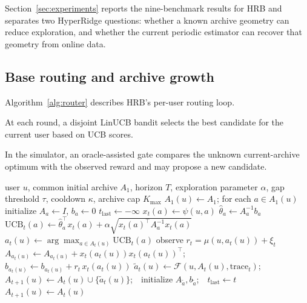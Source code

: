 \documentclass{article} %
\renewcommand{\eqref}[1]{\textup{(\ref{#1})}}
\begin{document}
Section~\ref{sec:experiments} reports the nine-benchmark results for
HRB and separates two HyperRidge questions: whether a known
archive geometry can reduce exploration, and whether the current periodic
estimator can recover that geometry from online data.

\subsection{Base routing and archive growth}

Algorithm~\ref{alg:router} describes HRB's per-user routing loop.

At each round, a disjoint LinUCB bandit selects the best candidate for the current user based on UCB scores.

In the simulator, an oracle-assisted gate compares the unknown current-archive optimum with the observed reward and may propose a new candidate.

\begin{algorithm}[t]
\caption{HyperRidge-Base (HRB): per-user routing over a growing archive}
\label{alg:router}
\begin{algorithmic}[1]
\Require user $u$, common initial archive $A_1$, horizon $T$, exploration parameter $\alpha$, gap threshold $\tau$, cooldown $\kappa$, archive cap $K_{\max}$
\State $A_1(u) \gets A_1$; for each $a \in A_1(u)$ initialize $A_a \gets I$, $b_a \gets 0$
\State $t_{\mathrm{last}} \gets -\infty$
        \State $x_t(a) \gets \psi(u,a)$ \Comment{feature map, \eqref{eq:method-feat}}
        \State $\hat\theta_a \gets A_a^{-1} b_a$
        \State $\mathrm{UCB}_t(a) \gets \hat\theta_a^\top x_t(a) + \alpha \sqrt{x_t(a)^\top A_a^{-1} x_t(a)}$
    \EndFor
    \State $a_t(u) \gets \arg\max_{a \in A_t(u)} \mathrm{UCB}_t(a)$
    \State observe $r_t = \mu(u, a_t(u)) + \xi_t$
    \State $A_{a_t(u)} \gets A_{a_t(u)} + x_t(a_t(u)) x_t(a_t(u))^\top$;\quad $b_{a_t(u)} \gets b_{a_t(u)} + r_t \, x_t(a_t(u))$
     
        \State $\tilde a_t(u) \gets \mathcal{F}(u, A_t(u), \mathrm{trace}_t)$;\ \ $A_{t+1}(u) \gets A_t(u) \cup \{\tilde a_t(u)\}$;\ \ initialize $A_{\tilde a}, b_{\tilde a}$;\ \ $t_{\mathrm{last}} \gets t$
    \Else
        \State $A_{t+1}(u) \gets A_t(u)$
    \EndIf
\EndFor
\end{algorithmic}
\end{algorithm}
\end{document}

